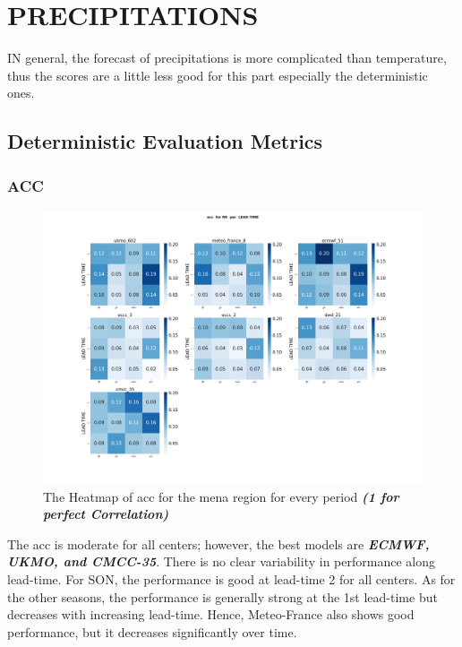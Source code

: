 \section{PRECIPITATIONS}
IN general, the forecast of precipitations is more complicated than temperature, thus the scores are a little less good for this part especially the deterministic ones. 
\subsection{Deterministic Evaluation Metrics}

\subsubsection{ACC}

\begin{figure}[H]
	\centering
	\includegraphics[scale=0.25]{plots/det/acc/acc_RR_mena.png}
	\caption{The Heatmap of acc for the mena region for every period \textbf{\textit{(1 for perfect Correlation)} }}
\end{figure}
The acc is moderate for all centers; however, the best models are \textbf{\textit{ECMWF, UKMO, and CMCC-35}}. There is no clear variability in performance along lead-time. For SON, the performance is good at lead-time 2 for all centers. As for the other seasons, the performance is generally strong at the 1st lead-time but decreases with increasing lead-time.
Hence, Meteo-France also shows good performance, but it decreases significantly over time.



